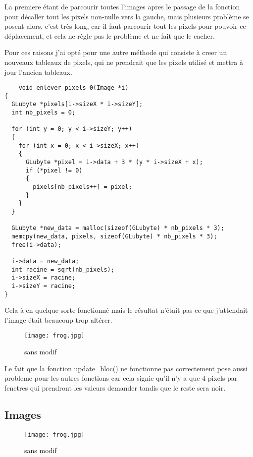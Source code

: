 \documentclass{article}
\begin{document}
La premiere étant de parcourir toutes l'images apres le passage de la fonction pour décaller tout les pixels non-nulle vers la gauche, mais plusieurs problème se posent alors, c'est très long, car il faut parcourir tout les pixels pour pouvoir ce déplacement, et cela ne règle pas le problème et ne fait que le cacher.

Pour ces raisons j'ai opté pour une autre méthode qui consiste à creer un nouveaux tableaux de pixels, qui ne prendrait que les pixels utilisé et mettra à jour l'ancien tableaux. \\

\begin{verbatim}
    void enlever_pixels_0(Image *i)
{
  GLubyte *pixels[i->sizeX * i->sizeY];
  int nb_pixels = 0;

  for (int y = 0; y < i->sizeY; y++)
  {
    for (int x = 0; x < i->sizeX; x++)
    {
      GLubyte *pixel = i->data + 3 * (y * i->sizeX + x);
      if (*pixel != 0)
      {
        pixels[nb_pixels++] = pixel;
      }
    }
  }

  GLubyte *new_data = malloc(sizeof(GLubyte) * nb_pixels * 3);
  memcpy(new_data, pixels, sizeof(GLubyte) * nb_pixels * 3);
  free(i->data);

  i->data = new_data;
  int racine = sqrt(nb_pixels);
  i->sizeX = racine;
  i->sizeY = racine;
}
\end{verbatim}
Cela à en quelque sorte fonctionné mais le résultat n'était pas ce que j'attendait l'image était beaucoup trop altérer.
 \begin{figure}
 \centering
 \texttt{[image: frog.jpg]}
 \caption{\label{fig:blank}sans modif}
 \end{figure}

 Le fait que la fonction update_bloc() ne fonctionne pas correctement pose aussi probleme pour les autres fonctions car cela signie qu'il n'y a que 4 pixels par fenetres qui prendront les valeurs demander tandis que le reste sera noir.


\subsection{Images}
\begin{figure}
 \centering
 \texttt{[image: frog.jpg]}
 \caption{\label{fig:blank}sans modif}
 \end{figure}
\end{document}
